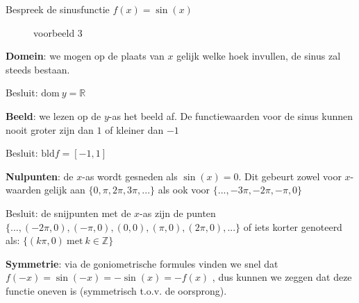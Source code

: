 \begin{voorbeeld}
	Bespreek de sinusfunctie $f(x)=\sin(x)$ 


\begin{figure}
	\centering          
	
	\caption{voorbeeld 3}
	\label{fig:reele_functies_vb3}	
\end{figure}


\textbf{Domein}: we mogen op de plaats van $x$ gelijk welke
hoek invullen, de sinus zal steeds bestaan.

Besluit: $\textrm{dom}\:y=\mathbb{R}$ 




\textbf{Beeld}: we lezen op de $y$-as het beeld af. De
functiewaarden voor de sinus kunnen nooit groter zijn dan $1$ of
kleiner dan $-1$

Besluit: $\textrm{bld}f=[-1,1]$




\textbf{Nulpunten}: de $x$-as wordt gesneden als $\sin(x)=0$.
Dit gebeurt zowel voor $x$-waarden gelijk aan $\{0,\pi,2\pi,3\pi,...\}$
als ook voor $\{...,-3\pi,-2\pi,-\pi,0\}$

Besluit: de snijpunten met de $x$-as zijn de punten $\{...,(-2\pi,0),(-\pi,0),(0,0),(\pi,0),(2\pi,0),...\}$
of iets korter genoteerd als: $\{(k\pi,0)\:\textrm{met}\:k\in\mathbb{Z}\}$




\textbf{Symmetrie}: via de goniometrische formules vinden
we snel dat $f(-x)=\sin(-x)=-\sin(x)=-f(x)$ , dus kunnen we zeggen
dat deze functie oneven is (symmetrisch t.o.v. de oorsprong).

\end{voorbeeld}